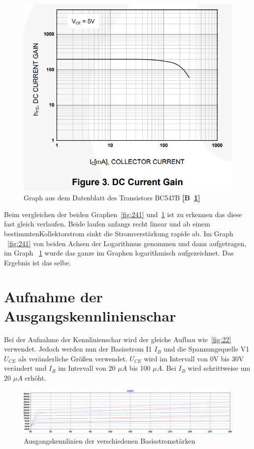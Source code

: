         \begin{figure}[!ht]
            \centering
            \includegraphics[]{Bilder/24datenblatt.PNG}
            \caption{Graph aus dem Datenblatt des Transistors BC547B \textbf{[B~\ref{fig:242}]}}
            \label{fig:242}
        \end{figure}

        Beim vergleichen der beiden Graphen~\ref{fig:241} und~\ref{fig:242} ist zu erkennen das diese fast gleich verlaufen. Beide laufen anfangs recht linear und ab einem bestimmtenKollektorstrom sinkt die Stromverstärkung rapide ab. Im Graph ~\ref{fig:241} von beiden Achsen der Logarithmus genommen und dann aufgetragen, im Graph ~\ref{fig:242} wurde das ganze im Graphen logarithmisch aufgezeichnet. Das Ergebnis ist das selbe.
        \newpage

    \section{Aufnahme der Ausgangskennlinienschar}
        Bei der Aufnahme der Kennlinienschar wird der gleiche Aufbau wie~\ref{fig:22} verwendet. Jedoch werden nun der Basisstrom I1 \(I_B\) und die Spannungsquelle V1 \(U_{CE}\) als veränderliche Größen verwendet. \(U_{CE}\) wird im Intervall von 0V bis 30V verändert und \(I_B\) im Intervall von 20 \(\mu A\) bis 100 \(\mu A\). Bei \(I_B\) wird schrittweise um 20 \(\mu A\) erhöht.

        \begin{figure}[!ht]
            \centering
            \includegraphics[width=\linewidth]{Bilder/25graph1.PNG}
            \caption{Ausgangskennlinien der verschiedenen Basisstromstärken}
            \label{fig:251}
        \end{figure}


